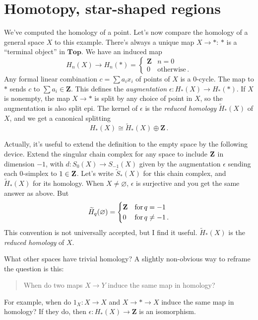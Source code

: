 \section{Homotopy, star-shaped regions}

We've computed the homology of a point. Let's now compare the homology of
a general space $X$ to this example. There's always a unique map $X\to\ast$: $\ast$ is a ``terminal object'' in $\mathbf{Top}$. We have an induced map 
\[ 
H_n(X)\to H_n(\ast)=
\begin{cases}\mathbf{Z} & n=0\\
0 & \text{otherwise}\,.\end{cases}
\]
Any formal linear combination $c=\sum a_i x_i$ of points of $X$ is a 0-cycle. 
The map to $\ast$ sends $c$ to $\sum a_i\in\mathbf{Z}$. This defines
the {\em augmentation} $\epsilon:H_*(X)\to H_*(\ast)$. 
If $X$ is nonempty, the map $X\to\ast$ is split by any choice of point in $X$,
so the augmentation is also split epi. The kernel of $\epsilon$ is the 
{\em reduced homology} $\widetilde H_*(X)$ of $X$, and we get a canonical 
splitting 
\[
H_*(X)\cong \widetilde H_*(X)\oplus\mathbf{Z}\,.
\]

Actually, it's useful to extend the definition to the empty space by the
following device. Extend the singular chain complex for any space to include 
$\mathbf Z$ in dimension $-1$, with $d:S_0(X)\to S_{-1}(X)$ given by the 
augmentation $\epsilon$ sending each $0$-simplex to $1\in\mathbf Z$. 
Let's write $\widetilde S_*(X)$ for this chain 
complex, and $\widetilde H_*(X)$ for its homology. 
When $X\neq\varnothing$, $\epsilon$ is surjective
and you get the same answer as above. But 
\[
\widetilde H_q(\varnothing)=
\begin{cases}\mathbf{Z} & \hbox{for}\,q=-1\\0 & \hbox{for}\,q\neq-1\,.
\end{cases}
\]
This convention is not universally accepted, but I find it useful.
$\widetilde H_*(X)$ is the {\em reduced homology} of $X$.

What other spaces have trivial homology? A slightly non-obvious way to reframe
the question is this:
\begin{quote}
When do two maps $X\to Y$ induce the same map in homology? 
\end{quote}
For example,
when do $1_X:X\to X$ and $X\to\ast\to X$ induce the same map in homology?
If they do, then $\epsilon:H_*(X)\to\mathbf{Z}$ is an isomorphism. 

